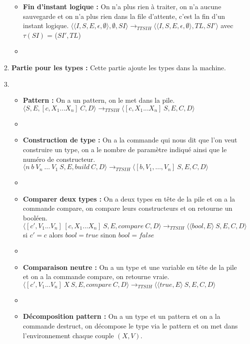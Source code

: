 \documentclass[10pt,a4paper]{report}
\begin{document}
\begin{enumerate}
\begin{itemize}
			\item[] \textbf{Fin d'instant logique :} On n'a plus rien à traiter, on n'a aucune sauvegarde et on n'a plus rien dans la file d'attente, c'est la fin d'un instant logique.
			\smallbreak
			$\langle\langle I,S,E,\epsilon,\emptyset \rangle ,\emptyset,SI\rangle 
			\longrightarrow_{TTSIH} 
			\langle\langle I,S,E,\epsilon,\emptyset\rangle,TL,SI'\rangle$
			avec $\tau(SI)$ = ($SI',TL$) 
			\item[]
			
		\end{itemize}
		\item[] \textbf{Partie pour les types :} Cette partie ajoute les types dans la machine.
		\item[]
		\begin{itemize}
			\item[] \textbf{Pattern :} On a un pattern, on le met dans la pile.
			\smallbreak
			$\langle S,E,[c,X_{1}...X_{n}]~C,D\rangle
			\longrightarrow_{TTSIH} \langle [c,X_{1}...X_{n}]~S,E,C,D\rangle$ 
			\item[]
			\item[] \textbf{Construction de type :} On a la commande qui nous dit que l'on veut construire un type, on a le nombre de paramètre indiqué ainsi que le numéro de constructeur.
			\smallbreak
			$\langle n~b~V_{n}~...~V_{1}~S,E,build~C,D\rangle
			\longrightarrow_{TTSIH} 
			\langle [b,V_{1},...,V_{n}]~S,E,C,D\rangle$
			\item[]
			\item[] \textbf{Comparer deux types :} On a deux types en tête de la pile et on a la commande compare, on compare leurs constructeurs et on retourne un booléen. 
			\smallbreak
			$\langle [c',V_{1}...V_{n}]~[c,X_{1}...X_{n}]~S,E,compare~C,D\rangle
			\longrightarrow_{TTSIH} 
			\langle \langle bool,E\rangle~S,E,C,D\rangle$ 
			\\ si $c'=c$ alors $bool = true$ sinon $bool = false$ 
			\item[]
			\item[] \textbf{Comparaison neutre :} On a un type et une variable en tête de la pile et on a la commande compare, on retourne vraie. 
			\smallbreak
			$\langle [c',V_{1}...V_{n}]~X~S,E,compare~C,D\rangle
			\longrightarrow_{TTSIH} 
			\langle \langle true,E\rangle~S,E,C,D\rangle$ 
			\item[]
			\item[] \textbf{Décomposition pattern :} On a un type et un pattern et on a la commande destruct, on décompose le type via le pattern et on met dans l'environnement chaque couple $(X,V)$.

\end{itemize}
\end{enumerate}
\end{document}
